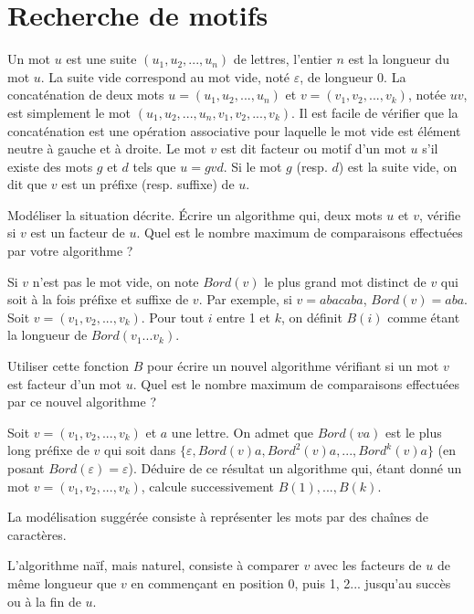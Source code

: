 \renewcommand{\SourceFile}{2-jouer-avec-les-mots/src/2-4.ml}

\section{Recherche de motifs}

Un mot $u$ est une suite $(u_1, u_2, ..., u_n)$ de lettres, l'entier $n$ est la longueur du mot $u$. La suite vide correspond au mot vide, noté $\varepsilon$, de longueur 0. La concaténation de deux mots $u=(u_1, u_2, ..., u_n)$ et $v=(v_1, v_2, ..., v_k)$, notée $uv$, est simplement le mot $(u_1, u_2, ..., u_n, v_1, v_2, ..., v_k)$. Il est facile de vérifier que la concaténation est une opération associative pour laquelle le mot vide est élément neutre à gauche et à droite. Le mot $v$ est dit facteur ou motif d'un mot $u$ s'il existe des mots $g$ et $d$ tels que $u=gvd$. Si le mot $g$ (resp. $d$) est la suite vide, on dit que $v$ est un préfixe (resp. suffixe) de $u$.

\Q
Modéliser la situation décrite. Écrire un algorithme qui,  deux mots $u$ et $v$, vérifie si $v$ est un facteur de $u$. Quel est le nombre maximum de comparaisons effectuées par votre algorithme ?

\Q
Si $v$ n'est pas le mot vide, on note $Bord(v)$ le plus grand mot distinct de $v$ qui soit à la fois préfixe et suffixe de $v$. Par exemple, si $v=abacaba$, $Bord(v)=aba$. Soit $v=(v_1, v_2, ..., v_k)$. Pour tout $i$ entre 1 et $k$, on définit $B(i)$ comme étant la longueur de $Bord(v_1 ... v_k)$.
\smallskip

Utiliser cette fonction $B$ pour écrire un nouvel algorithme vérifiant si un mot $v$ est facteur d'un mot $u$. Quel est le nombre maximum de comparaisons effectuées par ce nouvel algorithme ?

\Q
Soit $v=(v_1, v_2, ..., v_k)$ et $a$ une lettre. On admet que $Bord(va)$ est le plus long préfixe de $v$ qui soit dans $\{\varepsilon, Bord(v)a,Bord^2(v)a, ..., Bord^k(v)a\}$ (en posant $Bord(\varepsilon)=\varepsilon$). Déduire de ce résultat un algorithme qui, étant donné un mot $v=(v_1, v_2, ..., v_k)$, calcule successivement $B(1), ..., B(k)$.

\newpage

\Corrige

\Q
La modélisation suggérée consiste à représenter les mots par des chaînes de caractères.
\medskip

L'algorithme naïf, mais naturel, consiste à comparer $v$ avec les facteurs de $u$ de même longueur que $v$ en commençant en position 0, puis 1, 2... jusqu'au succès ou à la fin de $u$.

